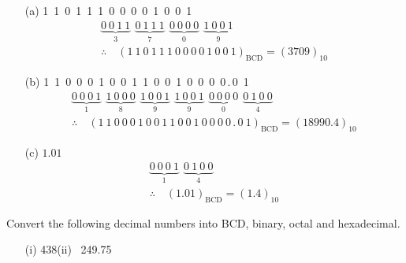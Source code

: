 \begin{solution}
\begin{itemize}
\item[(a)] 1~1~0~1~1~1~0~0~0~0~1~0~0~1
\begin{gather*}
\underbrace{0~0~1~1}_{3} \ \ \underbrace{0~1~1~1}_{7} \ \ \underbrace{0~0~0~0}_{0} \ \ \underbrace{1~0~0~1}_{9}\\[3pt]
\therefore\quad (1~1~0~1~1~1~0~0~0~0~1~0~0~1)_{\text{BCD}}=(3709)_{10}
\end{gather*}

\item[(b)] 1~1~0~0~0~1~0~0~1~1~0~0~1~0~0~0~0\,.\,0~1
\begin{gather*}
\underbrace{0~0~0~1}_{1} \ \ \underbrace{1~0~0~0}_{8} \ \ \underbrace{1~0~0~1}_{9} \ \ \underbrace{1~0~0~1}_{9} \ \ \underbrace{0~0~0~0}_{0} \ \ \underbrace{0~1~0~0}_{4}\\[4pt]
\therefore\quad (1~1~0~0~0~1~0~0~1~1~0~0~1~0~0~0~0\,.\,0~1)_{\text{BCD}}=(18990.4)_{10}
\end{gather*}

\item[(c)] $1.01$
\begin{gather*}
\underbrace{0~0~0~1}_{1} \ \ \underbrace{0~1~0~0}_{4}\\[3pt]
\therefore\quad (1.01)_{\text{BCD}}=(1.4)_{10}
\end{gather*}
\end{itemize}
\end{solution}

\begin{problem}\label{prob7.47}
Convert the following decimal numbers into BCD, binary, octal and hexadecimal.
\begin{itemize}
\item[(i)] 438\qquad\quad (ii)~ 249.75
\end{itemize}
\end{problem}


